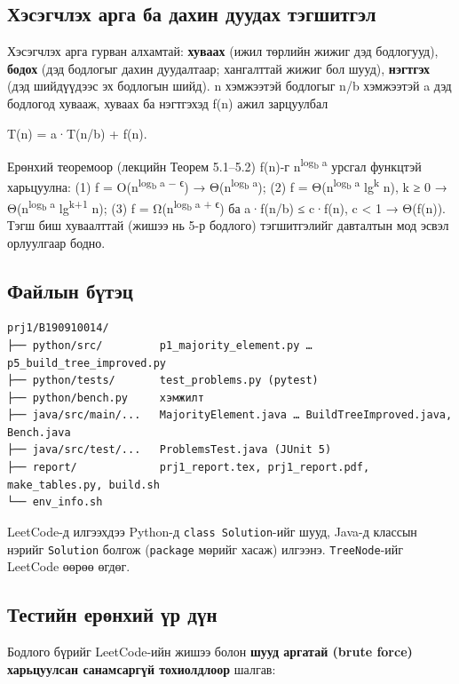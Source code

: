 \documentclass[11pt,a4paper]{article}
\begin{document}
\subsection{Хэсэгчлэх арга ба дахин дуудах тэгшитгэл}
Хэсэгчлэх арга гурван алхамтай: \textbf{хуваах} (ижил төрлийн жижиг дэд бодлогууд), \textbf{бодох} (дэд бодлогыг дахин дуудалтаар; хангалттай жижиг бол шууд), \textbf{нэгтгэх} (дэд шийдүүдээс эх бодлогын шийд). n хэмжээтэй бодлогыг n/b хэмжээтэй a дэд бодлогод хувааж, хуваах ба нэгтгэхэд f(n) ажил зарцуулбал

\begin{center}T(n) = a·T(n/b) + f(n).\end{center}

Ерөнхий теоремоор (лекцийн Теорем 5.1–5.2) f(n)-г n\textsuperscript{log\textsubscript{b} a} урсгал функцтэй харьцуулна: (1) f = O(n\textsuperscript{log\textsubscript{b} a − ϵ}) → Θ(n\textsuperscript{log\textsubscript{b} a}); (2) f = Θ(n\textsuperscript{log\textsubscript{b} a} lg\textsuperscript{k} n), k ≥ 0 → Θ(n\textsuperscript{log\textsubscript{b} a} lg\textsuperscript{k+1} n); (3) f = Ω(n\textsuperscript{log\textsubscript{b} a + ϵ}) ба a·f(n/b) ≤ c·f(n), c < 1 → Θ(f(n)). Тэгш биш хуваалттай (жишээ нь 5-р бодлого) тэгшитгэлийг давталтын мод эсвэл орлуулгаар бодно.

\subsection{Файлын бүтэц}
\begin{Verbatim}
prj1/B190910014/
├── python/src/         p1_majority_element.py … p5_build_tree_improved.py
├── python/tests/       test_problems.py (pytest)
├── python/bench.py     хэмжилт
├── java/src/main/...   MajorityElement.java … BuildTreeImproved.java, Bench.java
├── java/src/test/...   ProblemsTest.java (JUnit 5)
├── report/             prj1_report.tex, prj1_report.pdf, make_tables.py, build.sh
└── env_info.sh
\end{Verbatim}
LeetCode-д илгээхдээ Python-д \texttt{class Solution}-ийг шууд, Java-д классын нэрийг \texttt{Solution} болгож (\texttt{package} мөрийг хасаж) илгээнэ. \texttt{TreeNode}-ийг LeetCode өөрөө өгдөг.

\subsection{Тестийн ерөнхий үр дүн}
Бодлого бүрийг LeetCode-ийн жишээ болон \textbf{шууд аргатай (brute force) харьцуулсан санамсаргүй тохиолдлоор} шалгав:
\end{document}
